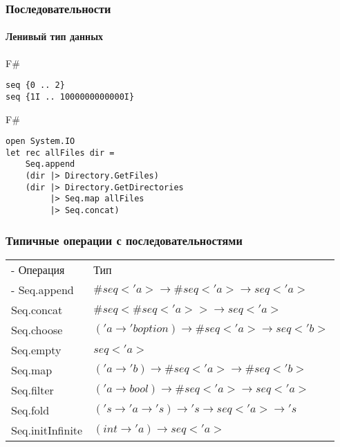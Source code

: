 \documentclass[xetex,mathserif,serif]{beamer}
\begin{document}
	\begin{frame}[fragile]
		\frametitle{Последовательности}
		\framesubtitle{Ленивый тип данных}
		\begin{exampleblock}{F\#}
			\begin{lstlisting}
seq {0 .. 2}
seq {1I .. 1000000000000I}
\end{lstlisting}
\end{exampleblock}

		\begin{exampleblock}{F\#}
			\begin{lstlisting}
open System.IO
let rec allFiles dir =
    Seq.append
    (dir |> Directory.GetFiles)
    (dir |> Directory.GetDirectories 
         |> Seq.map allFiles 
         |> Seq.concat)
\end{lstlisting}
\end{exampleblock}
\end{frame}

	\begin{frame}
		\frametitle{Типичные операции с последовательностями}
		\begin{small}
			\begin{tabu} {| X[0.5 l p] | X[1 l p] |}
				\tabucline-
				Операция                               & Тип                    \\
				\tabucline-
				\everyrow{\tabucline-}
				Seq.append                    & $\#seq<'a> \to \#seq<'a> \to seq<'a>$ \\
				Seq.concat                    & $\#seq<\#seq<'a>> \to seq<'a>$ \\
				Seq.choose                    & $('a \to 'b option) \to \#seq<'a> \to seq<'b>$ \\
				Seq.empty                     & $seq<'a>$ \\
				Seq.map                       & $('a \to 'b) \to \#seq<'a> \to \#seq<'b>$ \\
				Seq.filter                    & $('a \to bool) \to \#seq<'a> \to seq<'a>$ \\
				Seq.fold                      & $('s \to 'a \to 's) \to 's \to seq<'a> \to 's$ \\
				Seq.initInfinite          & $(int \to 'a) \to seq<'a>$ \\
\end{tabu}
\end{small}
\end{frame}
\end{document}

